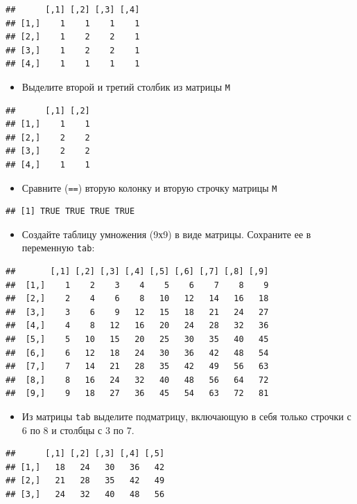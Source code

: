 \documentclass[]{book}
\providecommand{\tightlist}{%
  \setlength{\itemsep}{0pt}\setlength{\parskip}{0pt}}
\begin{document}
\begin{verbatim}
##      [,1] [,2] [,3] [,4]
## [1,]    1    1    1    1
## [2,]    1    2    2    1
## [3,]    1    2    2    1
## [4,]    1    1    1    1
\end{verbatim}

\begin{itemize}
\tightlist
\item
  Выделите второй и третий столбик из матрицы \texttt{M}
\end{itemize}

\begin{verbatim}
##      [,1] [,2]
## [1,]    1    1
## [2,]    2    2
## [3,]    2    2
## [4,]    1    1
\end{verbatim}

\begin{itemize}
\tightlist
\item
  Сравните (\texttt{==}) вторую колонку и вторую строчку матрицы \texttt{M}
\end{itemize}

\begin{verbatim}
## [1] TRUE TRUE TRUE TRUE
\end{verbatim}

\begin{itemize}
\tightlist
\item
  Создайте таблицу умножения (9х9) в виде матрицы. Сохраните ее в переменную \texttt{tab}:
\end{itemize}

\begin{verbatim}
##       [,1] [,2] [,3] [,4] [,5] [,6] [,7] [,8] [,9]
##  [1,]    1    2    3    4    5    6    7    8    9
##  [2,]    2    4    6    8   10   12   14   16   18
##  [3,]    3    6    9   12   15   18   21   24   27
##  [4,]    4    8   12   16   20   24   28   32   36
##  [5,]    5   10   15   20   25   30   35   40   45
##  [6,]    6   12   18   24   30   36   42   48   54
##  [7,]    7   14   21   28   35   42   49   56   63
##  [8,]    8   16   24   32   40   48   56   64   72
##  [9,]    9   18   27   36   45   54   63   72   81
\end{verbatim}

\begin{itemize}
\tightlist
\item
  Из матрицы \texttt{tab} выделите подматрицу, включающую в себя только строчки с 6 по 8 и столбцы с 3 по 7.
\end{itemize}

\begin{verbatim}
##      [,1] [,2] [,3] [,4] [,5]
## [1,]   18   24   30   36   42
## [2,]   21   28   35   42   49
## [3,]   24   32   40   48   56
\end{verbatim}
\end{document}
